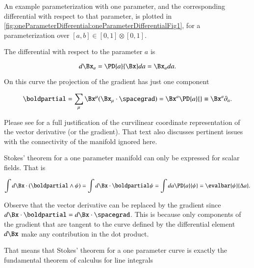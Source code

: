 %
%
An example parameterization with one parameter, and the corresponding differential with respect to that parameter, is plotted in
\cref{fig:oneParameterDifferential:oneParameterDifferentialFig1}, for a parameterization over \( [a, b] \in [0,1]\otimes[0,1] \).


The differential with respect to the parameter \( a \) is

\begin{equation}\label{eqn:oneparameter:20}
d\Bx_a = \PD{a}{\Bx} da = \Bx_a da.
\end{equation}

On this curve the projection of the gradient has just one component

\begin{dmath}\label{eqn:oneparameter:40}
\boldpartial
=
\sum_\mu \Bx^\mu (\Bx_\mu \cdot \spacegrad)
=
\Bx^a \PD{a}{}
\equiv
\Bx^a \partial_a.
\end{dmath}

Please see \citep{aMacdonaldVAGC} for a full justification of the curvilinear coordinate representation of the vector derivative (or the gradient).
That text also discusses pertinent issues with the connectivity of the manifold ignored here.

Stokes' theorem for a one parameter manifold can only be expressed for scalar fields.
That is

\begin{dmath}\label{eqn:oneparameter:60}
\int d\Bx \cdot (\boldpartial \wedge \psi)
=
\int d\Bx \cdot \boldpartial \psi
=
\int da \PD{a}{ \psi }
= \evalbar{\psi}{\Delta a}.
\end{dmath}

Observe that the vector derivative can be replaced by the gradient since \( d\Bx \cdot \boldpartial = d\Bx \cdot \spacegrad \).
This is because only components of the gradient that are tangent to the curve defined by the differential element \( d\Bx \) make any contribution in the dot product.

That means that Stokes' theorem for a one parameter curve is exactly the fundamental theorem of calculus for line integrals

